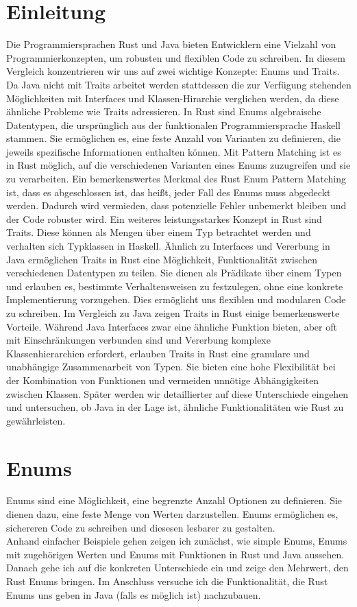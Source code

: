 \documentclass[a4paper, 1ppt]{article}
\begin{document}
\section{Einleitung}
Die Programmiersprachen Rust und Java bieten Entwicklern eine Vielzahl von Programmierkonzepten, um robusten und flexiblen Code zu schreiben. In diesem Vergleich konzentrieren wir uns auf zwei wichtige Konzepte: Enums und Traits. 
Da Java nicht mit Traits arbeitet werden stattdessen die zur Verfügung stehenden Möglichkeiten mit Interfaces und Klassen-Hirarchie verglichen werden, da diese ähnliche Probleme wie Traits adressieren.
In Rust sind Enums algebraische Datentypen, die ursprünglich aus der funktionalen Programmiersprache Haskell stammen. Sie ermöglichen es, eine feste Anzahl von Varianten zu definieren, die jeweils spezifische Informationen enthalten können. Mit Pattern Matching ist es in Rust möglich, auf die verschiedenen Varianten eines Enums zuzugreifen und sie zu verarbeiten. Ein bemerkenswertes Merkmal des Rust Enum Pattern Matching ist, dass es abgeschlossen ist, das heißt, jeder Fall des Enums muss abgedeckt werden. Dadurch wird vermieden, dass potenzielle Fehler unbemerkt bleiben und der Code robuster wird.
Ein weiteres leistungsstarkes Konzept in Rust sind Traits. Diese können als Mengen über einem Typ betrachtet werden und verhalten sich Typklassen in Haskell. Ähnlich zu Interfaces und Vererbung in Java ermöglichen Traits in Rust eine Möglichkeit, Funktionalität zwischen verschiedenen Datentypen zu teilen. Sie dienen als Prädikate über einem Typen und erlauben es, bestimmte Verhaltensweisen zu festzulegen, ohne eine konkrete Implementierung vorzugeben. Dies ermöglicht uns flexiblen und modularen Code zu schreiben.
Im Vergleich zu Java zeigen Traits in Rust einige bemerkenswerte Vorteile. Während Java Interfaces zwar eine ähnliche Funktion bieten, aber oft mit Einschränkungen verbunden sind und Vererbung komplexe Klassenhierarchien erfordert, erlauben Traits in Rust eine granulare und unabhängige Zusammenarbeit von Typen. Sie bieten eine hohe Flexibilität bei der Kombination von Funktionen und vermeiden unnötige Abhängigkeiten zwischen Klassen. Später werden wir detaillierter auf diese Unterschiede eingehen und untersuchen, ob Java in der Lage ist, ähnliche Funktionalitäten wie Rust zu gewährleisten.
\newpage
\section{Enums}
Enums sind eine Möglichkeit, eine begrenzte Anzahl Optionen zu definieren. Sie dienen dazu, eine feste Menge von Werten darzustellen. Enums ermöglichen es, sichereren Code zu schreiben und diesesen lesbarer zu gestalten.\\
Anhand einfacher Beispiele gehen zeigen ich zunächst, wie simple Enums, Enums mit zugehörigen Werten und Enums mit Funktionen in Rust und Java aussehen. Danach gehe ich auf die konkreten Unterschiede ein und zeige den Mehrwert, den Rust Enums bringen. 
Im Anschluss versuche ich die Funktionalität, die Rust Enums uns geben in Java (falls es möglich ist) nachzubauen.
\end{document}
